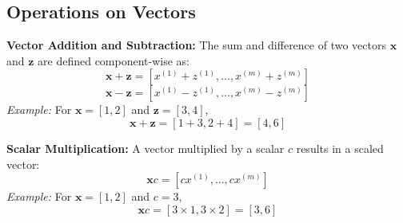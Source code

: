 \subsection{Operations on Vectors}

\textbf{Vector Addition and Subtraction:}
The sum and difference of two vectors \( \mathbf{x} \) and \( \mathbf{z} \) are defined component-wise as:
\[ \mathbf{x} + \mathbf{z} = \left[x^{(1)} + z^{(1)}, \ldots, x^{(m)} + z^{(m)}\right] \]
\[ \mathbf{x} - \mathbf{z} = \left[x^{(1)} - z^{(1)}, \ldots, x^{(m)} - z^{(m)}\right] \]
\emph{Example:} For \( \mathbf{x} = [1, 2] \) and \( \mathbf{z} = [3, 4] \),
\[ \mathbf{x} + \mathbf{z} = [1+3, 2+4] = [4, 6] \]

\textbf{Scalar Multiplication:}
A vector multiplied by a scalar \( c \) results in a scaled vector:
\[ \mathbf{x} c = \left[c x^{(1)}, \ldots, c x^{(m)}\right] \]
\emph{Example:} For \( \mathbf{x} = [1, 2] \) and \( c = 3 \),
\[ \mathbf{x} c = [3 \times 1, 3 \times 2] = [3, 6] \]

